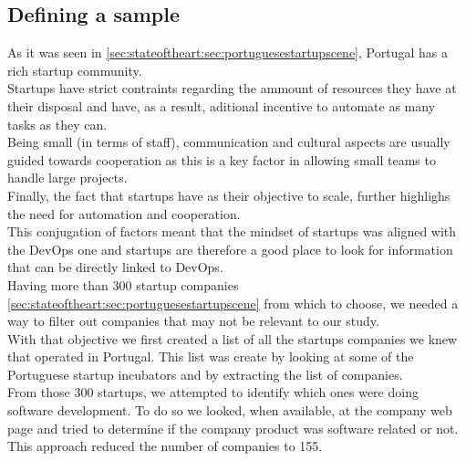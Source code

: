       \subsection{Defining a sample} \label{chap:towardsdevops:sec:methodology:sec:sample}
      As it was seen in \ref{sec:stateoftheart:sec:portuguesestartupscene}, Portugal has a rich startup community.\\
       Startups have strict contraints regarding the ammount of resources they have at their disposal and have, as a result, aditional incentive to automate as many tasks as they can. \\
      Being small (in terms of staff), communication and cultural aspects are usually guided towards cooperation as this is a key factor in allowing small teams to handle large projects. \\
      Finally, the fact that startups have as their objective to scale, further highlighs the need for automation and cooperation.\\
      This conjugation of factors meant that the mindset of startups was aligned with the DevOps one and startups are therefore a good place to look for information that can be directly linked to DevOps.\\
      Having more than 300 startup companies \ref{sec:stateoftheart:sec:portuguesestartupscene} from which to choose, we needed a way to filter out companies that may not be relevant to our study. \\
      With that objective we first created a list of all the startups companies we knew that operated in Portugal. This list was create by looking at some of the Portuguese startup incubators and by extracting the list of companies. \\
      From those 300 startups, we attempted to identify which ones were doing software development. To do so we looked, when available, at the company web page and tried to determine if the company product was software related or not. This approach reduced the number of companies to 155.

